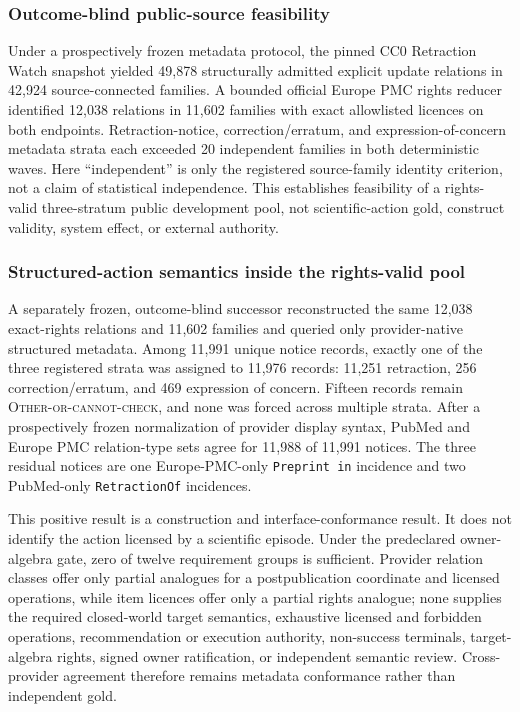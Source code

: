 \subsubsection{Outcome-blind public-source feasibility}
Under a prospectively frozen metadata protocol, the pinned CC0 Retraction Watch
snapshot yielded 49,878 structurally admitted explicit update relations in
42,924 source-connected families. A bounded official Europe PMC rights reducer
identified 12,038 relations in 11,602 families with exact allowlisted licences
on both endpoints. Retraction-notice, correction/erratum, and
expression-of-concern metadata strata each exceeded 20 independent families in
both deterministic waves. Here ``independent'' is only the registered
source-family identity criterion, not a claim of statistical independence.
This establishes feasibility of a rights-valid
three-stratum public development pool, not scientific-action gold, construct
validity, system effect, or external authority.

\subsubsection{Structured-action semantics inside the rights-valid pool}
A separately frozen, outcome-blind successor reconstructed the same 12,038
exact-rights relations and 11,602 families and queried only provider-native
structured metadata. Among 11,991 unique notice records, exactly one of the
three registered strata was assigned to 11,976 records: 11,251 retraction,
256 correction/erratum, and 469 expression of concern. Fifteen records remain
\textsc{Other-or-cannot-check}, and none was forced across multiple strata.
After a prospectively frozen normalization of provider display syntax,
PubMed and Europe PMC relation-type sets agree for 11,988 of 11,991 notices.
The three residual notices are one Europe-PMC-only \texttt{Preprint in}
incidence and two PubMed-only \texttt{RetractionOf} incidences.

This positive result is a construction and interface-conformance result. It
does not identify the action licensed by a scientific episode. Under the
predeclared owner-algebra gate, zero of twelve requirement groups is
sufficient. Provider relation classes offer only partial analogues for a
postpublication coordinate and licensed operations, while item licences offer
only a partial rights analogue; none supplies the required closed-world target
semantics, exhaustive licensed and forbidden operations, recommendation or
execution authority, non-success terminals, target-algebra rights, signed
owner ratification, or independent semantic review. Cross-provider agreement
therefore remains metadata conformance rather than independent gold.


